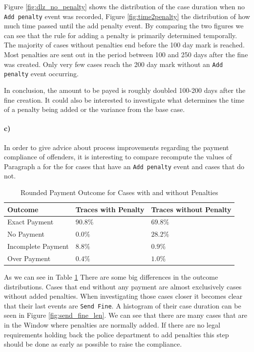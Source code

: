 \documentclass[12pt]{report}
\begin{document}
Figure \ref{fig:dlz_no_penalty} shows the distribution of the case duration when no \texttt{Add penalty} event was recorded, Figure \ref{fig:time2penalty} the distribution of how much time passed until the add penalty event. By comparing the two figures we can see that the rule for adding a penalty is primarily determined temporally. The majority of cases without penalties end before the 100 day mark is reached. Most penalties are sent out in the period between 100 and 250 days after the fine was created. Only very few cases reach the 200 day mark without an \texttt{Add penalty} event occurring.

In conclusion, the amount to be payed is roughly doubled 100-200 days after the fine creation. It could also be interested to investigate what determines the time of a penalty being added or the variance from the base case.

\paragraph{\textbf{c)}}
In order to give advice about process improvements regarding the payment compliance of offenders, it is interesting to compare recompute the values of Paragraph a for the for cases that have an
\texttt{Add penalty} event and cases that do not.

\begin{table}[H]
\centering
\begin{tabular}{|l|l|l|}
	\hline \textbf{Outcome} & \textbf{Traces with Penalty} & \textbf{Traces without Penalty} \\
	\hline Exact Payment & $90.8 \%$ & $ 69.8 \%$\\
	\hline No Payment & $0.0 \%$ & $28.2 \%$\\
	\hline Incomplete Payment& $8.8 \%$ & $0.9 \%$\\
	\hline Over Payment & $0.4 \%$ & $1.0 \%$\\
	\hline
\end{tabular}
\caption{Rounded Payment Outcome for Cases with and without Penalties}
\label{tab:3c}
\end{table}

As we can see in Table \ref{tab:3c} There are some big differences in the outcome distributions. Cases that end without any payment are almost exclusively cases without added penalties. When investigating those cases closer it becomes clear that their last events are \texttt{Send Fine}. A histogram of their case duration can be seen in Figure \ref{fig:send_fine_len}. We can see that there are many cases that are in the Window where penalties are normally added. If there are no legal requirements holding back the police department to add penalties this step should be done as early as possible to raise the compliance. \\
\end{document}
